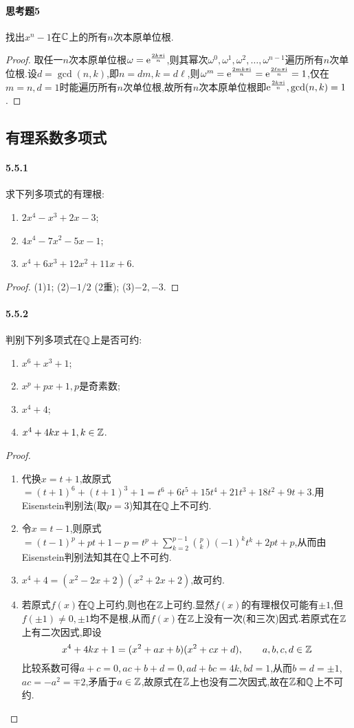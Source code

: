 \documentclass[11pt]{article}
\begin{document}
\paragraph{思考题5}找出$x^n-1$在$\mathbb{C}$上的所有$n$次本原单位根.
\begin{proof}
    取任一$n$次本原单位根$\omega=\mathrm{e}^{\frac{2k\pi\mathrm{i}}{n}}$,则其幂次$\omega^0, \omega^1, \omega^2,\dots,\omega^{n-1}$遍历所有$n$次单位根.设$d=\gcd(n,k)$,即$n=dm, k=d\ell$,则$\omega^m=\mathrm{e}^{\frac{2mk\pi\mathrm{i}}{n}}=\mathrm{e}^{\frac{2\ell n\pi\mathrm{i}}{n}}=1$,仅在$m=n, d=1$时能遍历所有$n$次单位根,故所有$n$次本原单位根即$\mathrm{e}^{\frac{2k\pi\mathrm{i}}{n}}, \gcd(n,k)=1$.
\end{proof}

\subsection{有理系数多项式}
\paragraph{5.5.1}求下列多项式的有理根:
\begin{enumerate}
    \item $2x^4-x^3+2x-3$;
    \item $4x^4-7x^2-5x-1$;
    \item $x^4+6x^3+12x^2+11x+6$.
\end{enumerate}
\begin{proof}
    (1)$1$; (2)$-1/2$ (2重); (3)$-2, -3$.
\end{proof}
\paragraph{5.5.2}判别下列多项式在$\mathbb{Q}$上是否可约:
\begin{enumerate}
    \item $x^6+x^3+1$;
    \item $x^p+px+1, p$是奇素数;
    \item $x^4+4$;
    \item $x^4+4kx+1, k\in \mathbb{Z}$.
\end{enumerate}
\begin{proof}
    \begin{enumerate}
        \item 代换$x=t+1$,故原式$=(t+1)^6+(t+1)^3+1=t^6+6 t^5+15 t^4+21 t^3+18 t^2+9 t+3$.用Eisenstein判别法(取$p=3$)知其在$\mathbb{Q}$上不可约.
        \item 令$x=t-1$,则原式$=(t-1)^p+pt+1-p=t^p+\sum_{k=2}^{p-1}\binom{p}{k}(-1)^{k}t^k+2pt+p$,从而由Eisenstein判别法知其在$\mathbb{Q}$上不可约.
        \item $x^4+4=(x^2-2x+2)(x^2+2x+2)$,故可约.
        \item 若原式$f(x)$在$\mathbb{Q}$上可约,则也在$\mathbb{Z}$上可约.显然$f(x)$的有理根仅可能有$\pm 1$,但$f(\pm 1)\neq 0, \pm 1$均不是根,从而$f(x)$在$\mathbb{Z}$上没有一次(和三次)因式.若原式在$\mathbb{Z}$上有二次因式,即设
        $$x^4+4kx+1=(x^2+ax+b)(x^2+cx+d), \qquad a,b,c,d\in\mathbb{Z}$$
        比较系数可得$a+c=0, ac+b+d=0, ad+bc=4k, bd=1$,从而$b=d=\pm 1$,$ac=-a^2=\mp 2$,矛盾于$a\in\mathbb{Z}$,故原式在$\mathbb{Z}$上也没有二次因式,故在$\mathbb{Z}$和$\mathbb{Q}$上不可约.
    \end{enumerate}
\end{proof}
\end{document}
